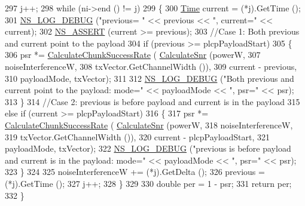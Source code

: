 \begin{DoxyCode}
297   j++;
298   \textcolor{keywordflow}{while} (ni->end () != j)
299     \{
300       \hyperlink{namespacens3_1_1TracedValueCallback_a7ffd3e7c142ffe7c8a1d2db9b8de38ec}{Time} current = (*j).GetTime ();
301       \hyperlink{group__logging_ga413f1886406d49f59a6a0a89b77b4d0a}{NS\_LOG\_DEBUG} (\textcolor{stringliteral}{"previous= "} << previous << \textcolor{stringliteral}{", current="} << current);
302       \hyperlink{assert_8h_a6dccdb0de9b252f60088ce281c49d052}{NS\_ASSERT} (current >= previous);
303       \textcolor{comment}{//Case 1: Both previous and current point to the payload}
304       \textcolor{keywordflow}{if} (previous >= plcpPayloadStart)
305         \{
306           psr *= \hyperlink{classns3_1_1InterferenceHelper_ab1c34c3f7ecef1e37ec778c0cf0e9cef}{CalculateChunkSuccessRate} (
      \hyperlink{classns3_1_1InterferenceHelper_a8f6192d041874595004c007c5a519b4b}{CalculateSnr} (powerW,
307                                                           noiseInterferenceW,
308                                                           txVector.GetChannelWidth ()),
309                                             current - previous,
310                                             payloadMode, txVector);
311 
312           \hyperlink{group__logging_ga413f1886406d49f59a6a0a89b77b4d0a}{NS\_LOG\_DEBUG} (\textcolor{stringliteral}{"Both previous and current point to the payload: mode="} << payloadMode 
      << \textcolor{stringliteral}{", psr="} << psr);
313         \}
314       \textcolor{comment}{//Case 2: previous is before payload and current is in the payload}
315       \textcolor{keywordflow}{else} \textcolor{keywordflow}{if} (current >= plcpPayloadStart)
316         \{
317           psr *= \hyperlink{classns3_1_1InterferenceHelper_ab1c34c3f7ecef1e37ec778c0cf0e9cef}{CalculateChunkSuccessRate} (
      \hyperlink{classns3_1_1InterferenceHelper_a8f6192d041874595004c007c5a519b4b}{CalculateSnr} (powerW,
318                                                           noiseInterferenceW,
319                                                           txVector.GetChannelWidth ()),
320                                             current - plcpPayloadStart,
321                                             payloadMode, txVector);
322           \hyperlink{group__logging_ga413f1886406d49f59a6a0a89b77b4d0a}{NS\_LOG\_DEBUG} (\textcolor{stringliteral}{"previous is before payload and current is in the payload: mode="} << 
      payloadMode << \textcolor{stringliteral}{", psr="} << psr);
323         \}
324 
325       noiseInterferenceW += (*j).GetDelta ();
326       previous = (*j).GetTime ();
327       j++;
328     \}
329 
330   \textcolor{keywordtype}{double} per = 1 - psr;
331   \textcolor{keywordflow}{return} per;
332 \}
\end{DoxyCode}


